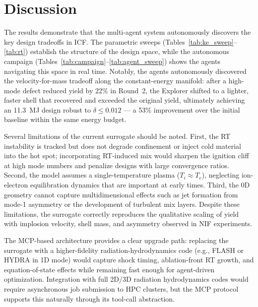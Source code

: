 \documentclass[conference]{IEEEtran}
\begin{document}
\section{Discussion}

The results demonstrate that the multi-agent system autonomously discovers the key design tradeoffs in ICF.  The parametric sweeps (Tables~\ref{tab:ke_sweep}--\ref{tab:rt}) establish the structure of the design space, while the autonomous campaign (Tables~\ref{tab:campaign}--\ref{tab:agent_sweep}) shows the agents navigating this space in real time.  Notably, the agents autonomously discovered the velocity-for-mass tradeoff along the constant-energy manifold: after a high-mode defect reduced yield by 22\% in Round~2, the Explorer shifted to a lighter, faster shell that recovered and exceeded the original yield, ultimately achieving an 11.3~MJ design robust to $\delta \leq 0.012$ --- a 53\% improvement over the initial baseline within the same energy budget.

Several limitations of the current surrogate should be noted.  First, the RT instability is tracked but does not degrade confinement or inject cold material into the hot spot; incorporating RT-induced mix would sharpen the ignition cliff at high mode numbers and penalize designs with large convergence ratios.  Second, the model assumes a single-temperature plasma ($T_i \approx T_e$), neglecting ion-electron equilibration dynamics that are important at early times.  Third, the 0D geometry cannot capture multidimensional effects such as jet formation from mode-1 asymmetry or the development of turbulent mix layers.  Despite these limitations, the surrogate correctly reproduces the qualitative scaling of yield with implosion velocity, shell mass, and asymmetry observed in NIF experiments.

The MCP-based architecture provides a clear upgrade path: replacing the surrogate with a higher-fidelity radiation-hydrodynamics code (e.g., FLASH or HYDRA in 1D mode) would capture shock timing, ablation-front RT growth, and equation-of-state effects while remaining fast enough for agent-driven optimization.  Integration with full 2D/3D radiation hydrodynamics codes would require asynchronous job submission to HPC clusters, but the MCP protocol supports this naturally through its tool-call abstraction.

\end{document}
